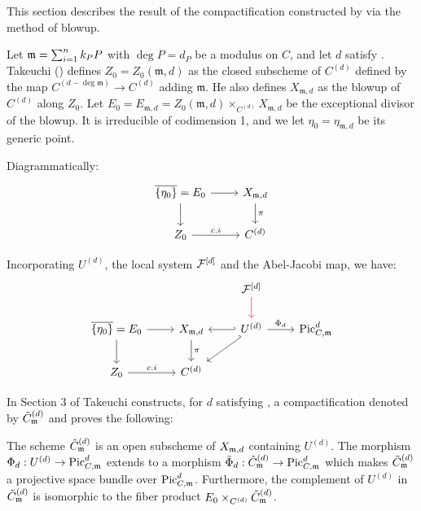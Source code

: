 This section describes the result of the compactification constructed by \cite{takeuchi2019blow}
via the method of blowup.

Let $\mdls = \sum_{i=1}^n k_P P$ with $\deg P = d_P$ be a modulus on $C$, and let $d$ satisfy
.
Takeuchi (\cite{takeuchi2019blow}) defines $Z_0=Z_0(\mathfrak{m}, d)$ as the closed subscheme of
$C^{(d)}$ defined by the map $C^{(d - \deg \mathfrak{m})} \to C^{(d)}$ adding $\mathfrak{m}$.
He also defines $X_{\mathfrak{m}, d}$ as the blowup of $C^{(d)}$ along $Z_0$.
Let $E_0 = E_{\mathfrak{m},d} = Z_0(\mathfrak{m}, d) \times_{C^{(d)}} X_{\mathfrak{m}, d}$ be the exceptional divisor of the blowup. It is irreducible of codimension 1, and we let $\eta_0=\eta_{\mathfrak{m}, d}$ be its generic point.

Diagrammatically:
\[\begin{tikzcd}
\overline{\{\eta_0 \}} =  E_0 \arrow[r] \arrow[d] & X_{\mdls, d} \arrow[d, "\pi"] \\
Z_0 \arrow[r, "c.i"]           & C^{(d)}
\end{tikzcd}\]

Incorporating $U^{(d)}$, the local system $\cF^{[d]}$ and the Abel-Jacobi map, we have:
\[
\begin{tikzcd}
    & & \cF^{[d]} \arrow[d, purple]\\
\overline{\{\eta_0 \}} =  E_0 \arrow[r] \arrow[d] &
X_{\mdls, d} \arrow[d, "\pi"]  & \arrow[l, hook'] \arrow[dl, hook'] U^{(d)} \arrow[r, "\Phi_d"] & \PicCm[d] \\
Z_0 \arrow[r, "c.i"]           & C^{(d)}
\end{tikzcd}
\]

In Section 3 of \cite{takeuchi2019blow} Takeuchi constructs, for $d$ satisfying , a compactification denoted by $\Cmod{d}$ and proves the following:

\begin{theorem}[Takeuchi]\label{theorem:takeuchi-compactification-theorem}
    The scheme $\Cmod{d}$ is an open subscheme of $X_{\mdls,d}$ containing $U^{(d)}$.
    The morphism $\Phi_d: U^{(d)} \to \PicCm[d]$ extends to a morphism $\tilde{\Phi}_d: \Cmod{d} \to \PicCm[d]$ which makes
    $\Cmod{d}$ a projective space bundle over $\PicCm[d]$.
    Furthermore, the complement of $U^{(d)}$ in $\Cmod{d}$ is isomorphic to the fiber product
    $E_0 \times_{C^{(d)}} \Cmod{d}$.
\end{theorem}

